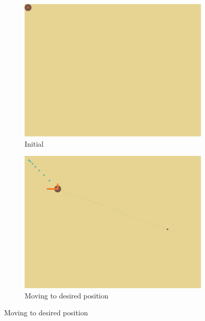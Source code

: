 \begin{figure}
	\centering
	\begin{subfigure}[b]{0.80\linewidth}
		\includegraphics[trim = 0mm 110mm 0mm 0mm, clip, width=\linewidth]{figures/BallTracker-initial.png}
		\caption{Initial}
		\label{fig:balltracker-initial}
	\end{subfigure}
	
	\begin{subfigure}[b]{0.80\linewidth}
		\includegraphics[trim = 0mm 110mm 0mm 0mm, clip, width=\linewidth]{figures/BallTracker-moving.png}
		\caption{Moving to desired position}
		\label{fig:balltracker-moving}
	\end{subfigure}
	

\end{figure}
